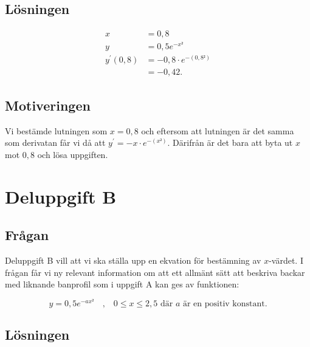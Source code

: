 \documentclass[a4paper,12pt]{article}
\begin{document}
    \newpage

    \subsection{Lösningen}

      \begin{align}
        \label{eq:1}
        x &= 0,8 \nonumber 
        \\
        y &= 0,5e^{-x²} \nonumber 
        \\
        y^{\prime}(0,8) &= -0,8 \cdot e^{-(0,8²)} 
        \\
        &=-0,42. \nonumber
      \end{align}

    \subsection{Motiveringen}

      Vi bestämde lutningen som $x = 0,8$ och eftersom att lutningen är det 
      samma som derivatan får vi då att $y^{\prime} = -x \cdot e^{-(x²)}$. 
      Därifrån är det bara att byta ut $x$ mot $0,8$ och lösa uppgiften.

\section{Deluppgift B}
  \label{sec:uppg2}

      \subsection{Frågan}

        Deluppgift B \cite{Skolverk} vill att vi ska ställa upp en ekvation för 
        bestämning av $x$-värdet.
        I frågan får vi ny relevant information om att ett allmänt sätt att 
        beskriva backar med liknande banprofil som i uppgift A kan ges av 
        funktionen: 

        \begin{displaymath}
          y = 0,5e^{-ax²}
          \quad \text{,} \quad
          0 \le x \le 2,5 
          \text{ där } a \text{ är en positiv konstant.}
        \end{displaymath}

      \subsection{Lösningen}
\end{document}
